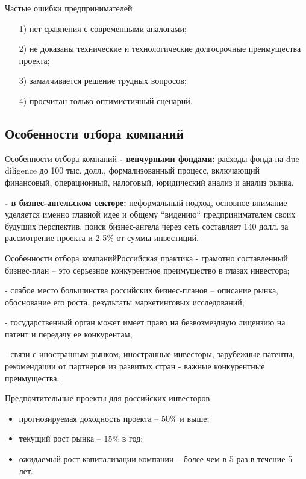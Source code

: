 \documentclass[_Venture_p2.tex]{subfiles}
\begin{document}
\begin{frame}{Частые ошибки предпринимателей}
\begin{itemize}
	\item[1)] нет сравнения с современными аналогами;
	\item[2)] не доказаны технические и технологические долгосрочные преимущества проекта;
	\item[3)] замалчивается решение трудных вопросов;
	\item[4)] просчитан только оптимистичный сценарий.
\end{itemize}
\end{frame}

\subsection{Особенности отбора компаний}
\begin{frame}{Особенности отбора компаний}
\textbf{- венчурными фондами:} расходы фонда на due diligence до 100 тыс. долл., формализованный процесс, включающий финансовый, операционный, налоговый, юридический анализ и анализ рынка.

\textbf{- в бизнес-ангельском секторе:} неформальный подход, основное внимание уделяется именно главной идее и общему ``видению`` предпринимателем своих будущих перспектив, поиск бизнес-ангела через сеть составляет 140 долл. за рассмотрение проекта и 2-5\% от суммы инвестиций.
\end{frame}

\begin{frame}{Особенности отбора компаний}{Российская практика}
- грамотно составленный бизнес-план – это серьезное конкурентное преимущество в глазах инвестора;

- слабое место большинства российских бизнес-планов – описание рынка, обоснование его роста, результаты маркетинговых исследований;

- государственный орган может имеет право на безвозмездную лицензию на патент и передачу ее конкурентам;

- связи с иностранным рынком, иностранные инвесторы, зарубежные патенты, рекомендации от партнеров из развитых стран - важные конкурентные преимущества.
\end{frame}

\begin{frame}{Предпочтительные проекты для российских инвесторов}
\begin{itemize}
\item	прогнозируемая доходность проекта – 50\% и выше;
\item	текущий рост рынка – 15\% в год;
\item	ожидаемый рост капитализации компании – более чем в 5 раз в течение 5 лет.
\end{itemize}
\end{frame}
\end{document}
